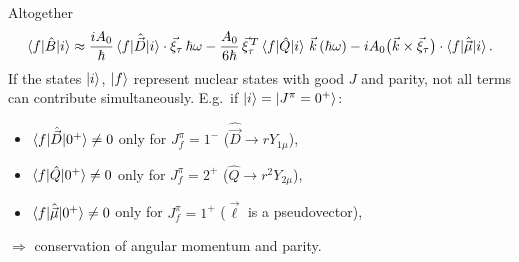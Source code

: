 \documentclass[11pt,a4paper]{article}
\newcommand{\op}[1]{\hat{#1}}
\begin{document}
Altogether
\[
\braket{f|\op B|i}\approx\frac{iA_0}{\hbar}\braket{f|\op{\vec D}|i}\cdot\vec\xi_\tau\,\hbar\omega
-\frac{A_0}{6\hbar}\,\vec\xi^{\,T}_\tau\braket{f|\op Q|i}\,\vec k\,(\hbar\omega)
-iA_0\big(\vec k\times\vec\xi_\tau\big)\cdot\braket{f|\op{\vec\mu}|i}.
\]
If the states $\ket i$, $\ket f$ represent nuclear states with good $J$ and parity, not all terms can contribute simultaneously. E.g.\ if $\ket i=\ket{J^\pi=0^+}$:
\begin{itemize}
\item $\braket{f|\op{\vec D}|0^+}\neq0$ only for $J^\pi_f=1^-$ ($\op{\vec D}\to rY_{1\mu}$),
\item $\braket{f|\op Q|0^+}\neq0$ only for $J^\pi_f=2^+$ ($\op Q\to r^2Y_{2\mu}$),
\item $\braket{f|\op{\vec\mu}|0^+}\neq0$ only for $J^\pi_f=1^+$ ($\vec\ell$ is a pseudovector),
\end{itemize}
$\Rightarrow$ conservation of angular momentum and parity.
\end{document}

